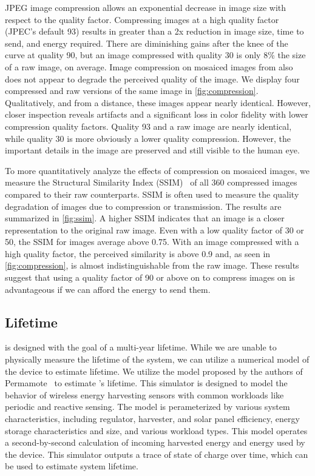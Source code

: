 JPEG image compression allows an exponential decrease in image size with respect to the quality factor.
Compressing images at a high quality factor (JPEC's default 93) results in greater than a 2x reduction in image size, time to send, and energy required. There are diminishing gains after the knee of the curve at quality 90, but an image compressed with quality 30 is only 8\% the size of a raw image, on average. Image compression on mosaiced images from \name also does not appear to degrade the perceived quality of the image. We display four compressed and raw versions of the same image in \cref{fig:compression}. Qualitatively, and from a distance, these images appear nearly identical. However, closer inspection reveals artifacts and a significant loss in color fidelity with lower compression quality factors. Quality 93 and a raw image are nearly identical, while quality 30 is more obviously a lower quality compression. However, the important details in the image are preserved and still visible to the human eye.


To more quantitatively analyze the effects of compression on mosaiced images, we measure the Structural Similarity Index (SSIM)~\cite{wang2004image} of all 360 compressed images compared to their raw counterparts. SSIM is often used to measure the quality degradation of images due to compression or transmission. The results are summarized in \cref{fig:ssim}. A higher SSIM indicates that an image is a closer representation to the original raw image.
Even with a low quality factor of 30 or 50, the SSIM for images average above 0.75. With an image compressed with a high quality factor, the perceived similarity is above 0.9 and, as seen in \cref{fig:compression}, is almost indistinguishable from the raw image. These results suggest that using a quality factor of 90 or above on to compress images on \name is advantageous if we can afford the energy to send them.

\subsection{Lifetime}
\name is designed with the goal of a multi-year lifetime. While we are unable to physically measure the lifetime of the system, we can utilize a numerical model of the device to estimate lifetime. We utilize the model proposed by the authors of Permamote~\cite{jackson2019capacity} to estimate \name's lifetime. 
This simulator is designed to model the behavior of wireless energy harvesting sensors with common workloads like periodic and reactive sensing. The model is perameterized by various system characteristics, including regulator, harvester, and solar panel efficiency, energy storage characteristics and size, and various workload types.
This model operates a second-by-second calculation of incoming harvested energy and energy used by the device.
This simulator outputs a trace of state of charge over time, which can be used to estimate system lifetime.

